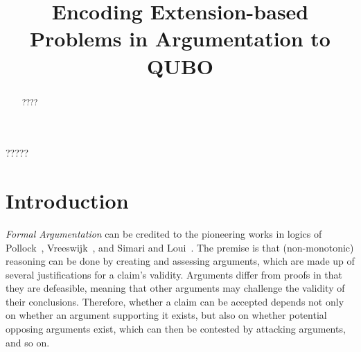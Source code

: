 \documentclass[conference]{IEEEtran}
\begin{document}
\title{Encoding Extension-based Problems in Argumentation to QUBO}

\author{
\and
{}
}

\maketitle

\begin{abstract}
????
\end{abstract}

\begin{IEEEkeywords}
?????
\end{IEEEkeywords}

\section{Introduction}\label{sect:intro}
\emph{Formal Argumentation} can be credited to the pioneering works in logics of Pollock~\cite{pollock92}, Vreeswijk~\cite{vreeswijk92}, and Simari and Loui~\cite{simari92}. The premise is that (non-monotonic) reasoning can be done by creating and assessing arguments, which are made up of several justifications for a claim's validity. Arguments differ from proofs in that they are defeasible, meaning that other arguments may challenge the validity of their conclusions. Therefore, whether a claim can be accepted depends not only on whether an argument supporting it exists, but also on whether potential opposing arguments exist, which can then be contested by attacking arguments, and so on.
\end{document}
